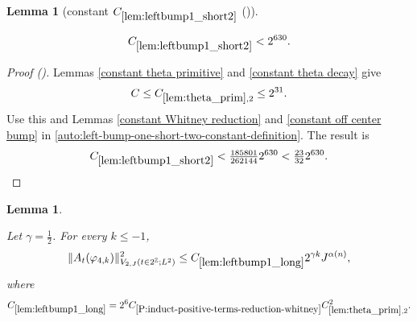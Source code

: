 \documentclass[12pt,reqno]{amsart}
\newcommand{\auto}{{({\tiny\faCar})}}
\theoremstyle{plain}
\newtheorem{lemma}[theorem]{Lemma}
\numberwithin{equation}{section}
\theoremstyle{remark}
\newcommand{\uses}[1]{}
\newcommand{\usesdefs}[1]{}
\newcommand{\leanok}{}
\newcommand{\lean}[1]{}
\begin{document}
\begin{lemma}[constant $C_{\ref{lem:leftbump1_short2}}$ \auto]\label{constant left bump one short two}\uses{lem:theta_prim,constant theta primitive,constant theta decay,constant Whitney reduction,constant off center bump,lem:leftbump1_short2}\usesdefs{}
\lean{Auto.constantLeftBumpOneShortTwo}
\leanok
\begin{equation}\label{constant left bump one short two bound}
C_{\ref{lem:leftbump1_short2}}
<2^{630}.
\end{equation}
\end{lemma}
\begin{proof}[Proof \auto]
Lemmas \ref{constant theta primitive} and \ref{constant theta decay} give
\[
C\le C_{\ref{lem:theta_prim},2}\le2^{31}.
\]
Use this and Lemmas \ref{constant Whitney reduction} and \ref{constant off center bump} in \eqref{auto:left-bump-one-short-two-constant-definition}. The result is
\[
C_{\ref{lem:leftbump1_short2}}
<\tfrac{185801}{262144}2^{630}
<\tfrac{23}{32}2^{630}.
\]
\end{proof}


\begin{lemma}\label{lem:leftbump1_long}\uses{lem:bootstrap,Extension of sequences,A to Lambda,lem:theta_prim,P:induct-positive-terms-reduction-whitney,lem:phi4_supp,lem:form_pos}\usesdefs{A_def,bracket bump,normalized function tuples,auto:prism-form-definition,multiplicatively spaced monotone sequences,defn:window based bump functions}
\lean{Auto.leftBumpOneLong}
\leanok
Let $\gamma=\frac12$. For every $k\le-1$,
\begin{equation}\label{auto:left-bump-one-long-bound}
\|A_t(\varphi_{4,k})\|_{V_{2,J}(t\in2^\mathbb Z;L^2)}^2
\le C_{\ref{lem:leftbump1_long}}2^{\gamma k}J^{\alpha(n)},
\end{equation}
where
\begin{equation}\label{auto:left-bump-one-long-constant-definition}
C_{\ref{lem:leftbump1_long}}
=2^6C_{\ref{P:induct-positive-terms-reduction-whitney}}
C_{\ref{lem:theta_prim},2}^2.
\end{equation}
\end{lemma}
\end{document}
